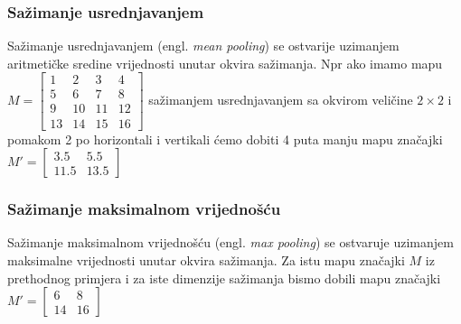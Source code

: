 \documentclass[times, utf8, zavrsni, numeric]{fer}
\begin{document}
\subsubsection{Sažimanje usrednjavanjem}
Sažimanje usrednjavanjem (engl. \textit{mean pooling}) se ostvarije uzimanjem aritmetičke sredine vrijednosti unutar okvira sažimanja. Npr ako imamo mapu $M = \left[
\begin{matrix}
1 & 2 & 3 & 4 \\
5 & 6 & 7 & 8 \\ 
9 & 10 & 11 & 12 \\
13 & 14 & 15 & 16
\end{matrix} \right]
$
sažimanjem usrednjavanjem sa okvirom veličine $2 \times 2$ i pomakom 2 po horizontali i vertikali ćemo dobiti 4 puta manju mapu značajki $M' = \left[
\begin{matrix}
3.5 & 5.5 \\
11.5 & 13.5
\end{matrix} \right]
$

\subsubsection{Sažimanje maksimalnom vrijednošću}
Sažimanje maksimalnom vrijednošću (engl. \textit{max pooling}) se ostvaruje uzimanjem maksimalne vrijednosti unutar okvira sažimanja. Za istu mapu značajki $M$ iz prethodnog primjera i za iste dimenzije sažimanja bismo dobili mapu značajki $M' = \left[
\begin{matrix}
6 & 8 \\
14 & 16
\end{matrix} \right]
$
\end{document}
